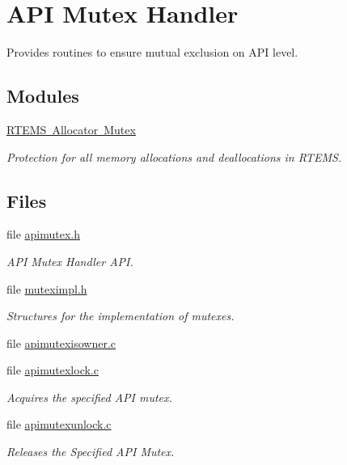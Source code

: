 \hypertarget{group__RTEMSScoreAPIMutex}{}\section{A\+PI Mutex Handler}
\label{group__RTEMSScoreAPIMutex}


Provides routines to ensure mutual exclusion on A\+PI level.  


\subsection*{Modules}
\begin{DoxyCompactItemize}
\item 
\mbox{\hyperlink{group__RTEMSScoreAllocatorMutex}{R\+T\+E\+M\+S Allocator Mutex}}
\begin{DoxyCompactList}\small\item\em Protection for all memory allocations and deallocations in R\+T\+E\+MS. \end{DoxyCompactList}\end{DoxyCompactItemize}
\subsection*{Files}
\begin{DoxyCompactItemize}
\item 
file \mbox{\hyperlink{apimutex_8h}{apimutex.\+h}}
\begin{DoxyCompactList}\small\item\em A\+PI Mutex Handler A\+PI. \end{DoxyCompactList}\item 
file \mbox{\hyperlink{score_2muteximpl_8h}{muteximpl.\+h}}
\begin{DoxyCompactList}\small\item\em Structures for the implementation of mutexes. \end{DoxyCompactList}\item 
file \mbox{\hyperlink{apimutexisowner_8c}{apimutexisowner.\+c}}
\item 
file \mbox{\hyperlink{apimutexlock_8c}{apimutexlock.\+c}}
\begin{DoxyCompactList}\small\item\em Acquires the specified A\+PI mutex. \end{DoxyCompactList}\item 
file \mbox{\hyperlink{apimutexunlock_8c}{apimutexunlock.\+c}}
\begin{DoxyCompactList}\small\item\em Releases the Specified A\+PI Mutex. \end{DoxyCompactList}\end{DoxyCompactItemize}
